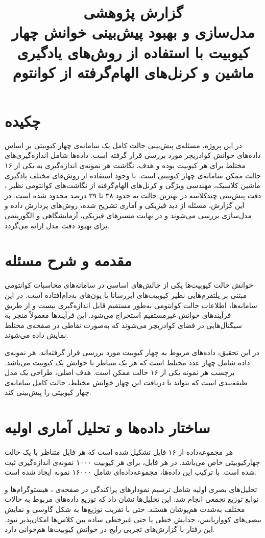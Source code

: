 \documentclass[12pt,a4paper]{article}
\title{%
گزارش پژوهشی\\
\large مدل‌سازی و بهبود پیش‌بینی خوانش چهار کیوبیت با استفاده از روش‌های یادگیری ماشین و کرنل‌های الهام‌گرفته از کوانتوم
}
\author{ }
\date{}
\begin{document}
\maketitle

\section*{چکیده}
در این پروژه، مسئله‌ی پیش‌بینی حالت کامل یک سامانه‌ی چهار کیوبیتی بر اساس داده‌های خوانش کوادریچر مورد بررسی قرار گرفته است. داده‌ها شامل اندازه‌گیری‌های مختلط برای هر کیوبیت بوده و هدف، نگاشت هر نمونه‌ی اندازه‌گیری به یکی از ۱۶ حالت ممکن سامانه‌ی چهار کیوبیتی است. با وجود استفاده از روش‌های مختلف یادگیری ماشین کلاسیک، مهندسی ویژگی و کرنل‌های الهام‌گرفته از نگاشت‌های کوانتومی نظیر ، دقت پیش‌بینی چندکلاسه در بهترین حالت به حدود ۳۸ تا ۳۹ درصد محدود شده است. در این گزارش، مسئله از دید فیزیکی و آماری تشریح شده، روش‌های پردازش داده و مدل‌سازی بررسی می‌شوند و در نهایت مسیرهای فیزیکی، آزمایشگاهی و الگوریتمی برای بهبود دقت مدل ارائه می‌گردد.

\section{مقدمه و شرح مسئله}
خوانش حالت کیوبیت‌ها یکی از چالش‌های اساسی در سامانه‌های محاسبات کوانتومی مبتنی بر پلتفرم‌هایی نظیر کیوبیت‌های ابررسانا یا یون‌های به‌دام‌افتاده است. در این سامانه‌ها، اطلاعات حالت کوانتومی به‌طور مستقیم قابل اندازه‌گیری نیست و از طریق فرآیندهای خوانش غیرمستقیم استخراج می‌شود. این فرآیندها معمولاً منجر به سیگنال‌هایی در فضای کوادریچر می‌شوند که به‌صورت نقاطی در صفحه‌ی مختلط  نمایش داده می‌شوند.

در این تحقیق، داده‌های مربوط به چهار کیوبیت مورد بررسی قرار گرفته‌اند. هر نمونه‌ی داده شامل چهار عدد مختلط است که هر یک متناظر با خوانش یک کیوبیت می‌باشد. برچسب هر نمونه یکی از ۱۶ حالت ممکن  است. هدف اصلی، طراحی یک مدل طبقه‌بندی است که بتواند با دریافت این چهار خوانش مختلط، حالت کامل سامانه‌ی چهار کیوبیتی را پیش‌بینی کند.

\section{ساختار داده‌ها و تحلیل آماری اولیه}
هر مجموعه‌داده از ۱۶ فایل تشکیل شده است که هر فایل متناظر با یک حالت چهارکیوبیتی خاص می‌باشد. در هر فایل، برای هر کیوبیت ۱۰۰۰ نمونه‌ی اندازه‌گیری ثبت شده است. با ترکیب این داده‌ها، مجموعه‌داده‌ای شامل ۱۶۰۰۰ نمونه ایجاد شده است.

تحلیل‌های بصری اولیه شامل ترسیم نمودارهای پراکندگی در صفحه‌ی ، هیستوگرام‌ها و توابع توزیع تجمعی انجام شد. این تحلیل‌ها نشان داد که توزیع داده‌های مربوط به حالات مختلف به‌شدت هم‌پوشان هستند. حتی با تقریب توزیع‌ها به شکل گاوسی و نمایش بیضی‌های کوواریانس، جدایش خطی یا حتی غیرخطی ساده بین کلاس‌ها امکان‌پذیر نبود. این رفتار با گزارش‌های تجربی رایج در خوانش کیوبیت‌ها هم‌خوانی دارد.
\end{document}
